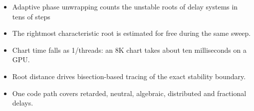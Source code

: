 \begin{itemize}
\item Adaptive phase unwrapping counts the unstable roots of delay systems in tens of steps
\item The rightmost characteristic root is estimated for free during the same sweep.
\item Chart time falls as 1/threads: an 8K chart takes about ten milliseconds on a GPU.
\item Root distance drives bisection-based tracing of the exact stability boundary.
\item One code path covers retarded, neutral, algebraic, distributed and fractional delays.
\end{itemize}
